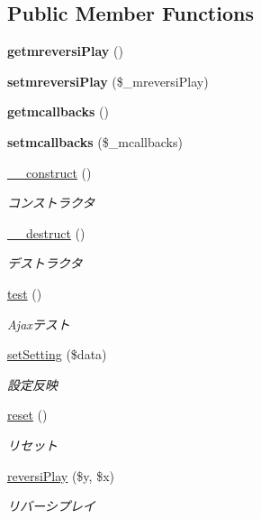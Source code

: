 \subsection*{Public Member Functions}
\begin{DoxyCompactItemize}
\item 
\mbox{\label{class_c_ajax_utility_a3c233a6d5298f136e92700e6395070bc}} 
{\bfseries getmreversi\+Play} ()
\item 
\mbox{\label{class_c_ajax_utility_a05d77b59d799214fa7b4be00f10e99ba}} 
{\bfseries setmreversi\+Play} (\$\+\_\+mreversi\+Play)
\item 
\mbox{\label{class_c_ajax_utility_a4709b99adfa26d2049a3c68ef1ff3e0d}} 
{\bfseries getmcallbacks} ()
\item 
\mbox{\label{class_c_ajax_utility_a8dd6bf96070e0b79942dc5fc0d52004c}} 
{\bfseries setmcallbacks} (\$\+\_\+mcallbacks)
\item 
\hyperlink{class_c_ajax_utility_a095c5d389db211932136b53f25f39685}{\+\_\+\+\_\+construct} ()
\begin{DoxyCompactList}\small\item\em コンストラクタ \end{DoxyCompactList}\item 
\hyperlink{class_c_ajax_utility_a421831a265621325e1fdd19aace0c758}{\+\_\+\+\_\+destruct} ()
\begin{DoxyCompactList}\small\item\em デストラクタ \end{DoxyCompactList}\item 
\hyperlink{class_c_ajax_utility_ad69dd4607977cae05ebe19d1ae604fb1}{test} ()
\begin{DoxyCompactList}\small\item\em Ajaxテスト \end{DoxyCompactList}\item 
\hyperlink{class_c_ajax_utility_aeac0165d3e235a9aed9d1d5e9eec9f9c}{set\+Setting} (\$data)
\begin{DoxyCompactList}\small\item\em 設定反映 \end{DoxyCompactList}\item 
\hyperlink{class_c_ajax_utility_a4a20559544fdf4dcb457e258dc976cf8}{reset} ()
\begin{DoxyCompactList}\small\item\em リセット \end{DoxyCompactList}\item 
\hyperlink{class_c_ajax_utility_a017d2d85f7c5c6917f528f30452d72d0}{reversi\+Play} (\$y, \$x)
\begin{DoxyCompactList}\small\item\em リバーシプレイ \end{DoxyCompactList}\end{DoxyCompactItemize}
